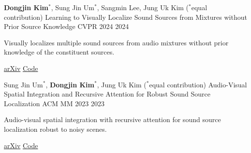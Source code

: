 \begin{cventries}

  \cventry
    {\textbf{Dongjin Kim}$^*$, Sung Jin Um$^*$, Sangmin Lee, Jung Uk Kim \quad ($^*$equal contribution)}
    {Learning to Visually Localize Sound Sources from Mixtures without Prior Source Knowledge}
    {CVPR 2024}
    {2024}
    {%
      \begin{cvitems}
        \item Visually localizes multiple sound sources from audio mixtures without prior knowledge of the constituent sources.
        \item \href{https://arxiv.org/pdf/2403.17420}{arXiv} \quad
              \href{https://github.com/VisualAIKHU/NoPrior_MultiSSL}{Code}
      \end{cvitems}
    }

\end{cventries}


\begin{cventries}

  \cventry
    {Sung Jin Um$^*$, \textbf{Dongjin Kim}$^*$, Jung Uk Kim \quad ($^*$equal contribution)}
    {Audio-Visual Spatial Integration and Recursive Attention for Robust Sound Source Localization}
    {ACM MM 2023}
    {2023}
    {%
      \begin{cvitems}
        \item Audio-visual spatial integration with recursive attention for sound source localization robust to noisy scenes.
        \item \href{https://arxiv.org/pdf/2308.06087}{arXiv} \quad
              \href{https://github.com/VisualAIKHU/SIRA-SSL}{Code}
      \end{cvitems}
    }

\end{cventries}

